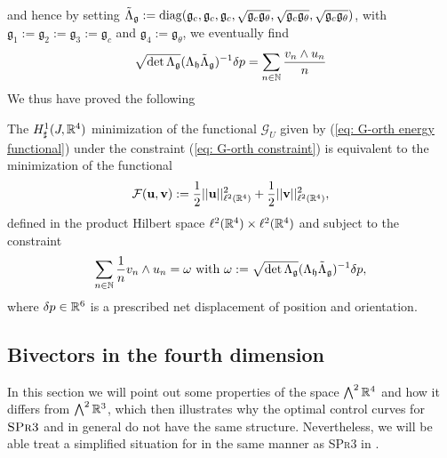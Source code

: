 and hence by setting $\tilde{\Lambda}_{\mathfrak{g}} := \operatorname{diag}(\mathfrak{g}_c, \mathfrak{g}_c, \mathfrak{g}_c, \sqrt{\mathfrak{g}_c \mathfrak{g}_{\theta}}, \sqrt{\mathfrak{g}_c \mathfrak{g}_{\theta}}, \sqrt{\mathfrak{g}_c  \mathfrak{g}_{\theta}})$, with $\mathfrak{g}_1 :=\mathfrak{g}_2 := \mathfrak{g}_3 := \mathfrak{g}_c$ and $\mathfrak{g}_4 := \mathfrak{g}_\theta$, we eventually find
\begin{equation}
\sqrt{\det \Lambda_{\mathfrak{g}}} (\Lambda_{\mathfrak{h}} \tilde{\Lambda}_{\mathfrak{g}})^{-1} \delta p = \sum_{n \in \mathbb{N}} \frac{v_n  \wedge u_n}{n}
\end{equation}
We thus have proved the following

\begin{proposition}
\label{prop: l2-minimization}
The $H_{\sharp}^1(J, \mathbb{R}^4)$ minimization of the functional $\mathcal{G}_U$ given by (\ref{eq: G-orth energy functional}) under the constraint (\ref{eq: G-orth constraint}) is equivalent to the minimization of the functional
\begin{equation}
\label{eq:l2-energy}
	\mathcal{F}(\mathbf{u}, \mathbf{v}) := \frac{1}{2} ||\mathbf{u} ||^2_{\ell^2(\mathbb{R}^4)} + \frac{1}{2} ||\mathbf{v}||^2_{\ell^2(\mathbb{R}^4)},
\end{equation}
defined in the product Hilbert space $\ell^2(\mathbb{R}^4) \times \ell^2(\mathbb{R}^4)$ and subject to the constraint
\begin{equation}
\label{eq:l2-constraint}
\sum_{n \in \mathbb{N}} \frac{1}{n} v_n \wedge u_n = \omega \text{ with } \omega := \sqrt{\det \Lambda_{\mathfrak{g}}}(\Lambda_{\mathfrak{h}} \tilde{\Lambda}_{\mathfrak{g}})^{-1} \delta p,
\end{equation}
where $\delta p \in \mathbb{R}^6$ is a prescribed net displacement of position and orientation.
\end{proposition}

\subsection{Bivectors in the fourth dimension}
In this section we will point out some properties of the space $\bigwedge^2 \mathbb{R}^4$ and how it differs from $\bigwedge^2 \mathbb{R}^3$, which then illustrates why the optimal control curves for $\textsc{SPr3}$ and \spr in general do not have the same structure. Nevertheless, we will be able treat a simplified situation for \spr in the same manner as \textsc{SPr3} in \cite{Alouges2017}.

